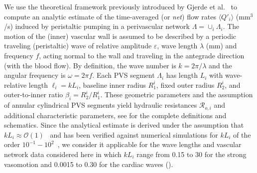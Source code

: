 \documentclass[fleqn,10pt]{wlscirep}
\begin{document}
We use the theoretical framework previously introduced by Gjerde et al.~\cite{gjerde2023directional} to compute an analytic estimate of the time-averaged (or \emph{net}) flow rates $\langle Q'_i \rangle$ (mm$^3$/s) induced by peristaltic pumping in a perivascular network $\Lambda = \cup_i \Lambda_i$. The motion of the (inner) vascular wall is assumed to be described by a periodic traveling (peristaltic) wave of relative amplitude $\varepsilon$, wave length $\lambda$ (mm) and frequency $f$, acting normal to the wall and traveling in the antegrade direction (with the blood flow). By definition, the wave number is $k = 2 \pi/\lambda$ and the angular frequency is $\omega = 2 \pi f$. Each PVS segment $\Lambda_i$ has length $L_i$ with wave-relative length $\ell_i = k L_i$, baseline inner radius $R_1^i$, fixed outer radius $R_2^i$, and outer-to-inner ratio $\beta_i = R_2^i/R_1^i$. These geometric parameters and the assumption of annular cylindrical PVS segments yield hydraulic resistances $\mathcal{R}_{o, i}$ and additional characteristic parameters, see \cite{gjerde2023directional} for the complete definitions and schematics. Since the analytical estimate is derived under the assumption that $k L_i \approx \mathcal{O} (1)$~\cite{gjerde2023directional} and has been verified against numerical simulations for $k L_i$ of the order $10^{-1}-10^2$~\cite[Table I]{gjerde2023directional}, we consider it applicable for the wave lengths and vascular network data considered here in which $k L_i$ range from 0.15 to 30 for the strong vasomotion and 0.0015 to 0.30 for the cardiac waves ().
\end{document}
